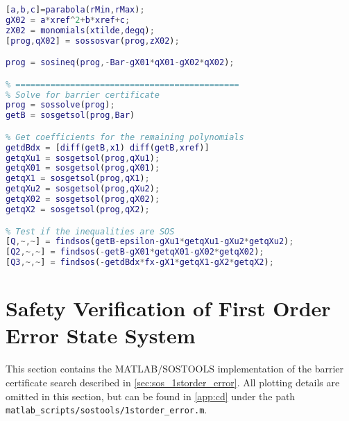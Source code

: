 \begin{lstlisting}[language=matlab]
[a,b,c]=parabola(rMin,rMax);
gX02 = a*xref^2+b*xref+c;
zX02 = monomials(xtilde,degq);
[prog,qX02] = sossosvar(prog,zX02);

prog = sosineq(prog,-Bar-gX01*qX01-gX02*qX02);

% =============================================
% Solve for barrier certificate
prog = sossolve(prog);
getB = sosgetsol(prog,Bar)

% Get coefficients for the remaining polynomials
getdBdx = [diff(getB,x1) diff(getB,xref)]
getqXu1 = sosgetsol(prog,qXu1);
getqX01 = sosgetsol(prog,qX01);
getqX1 = sosgetsol(prog,qX1);
getqXu2 = sosgetsol(prog,qXu2);
getqX02 = sosgetsol(prog,qX02);
getqX2 = sosgetsol(prog,qX2);

% Test if the inequalities are SOS
[Q,~,~] = findsos(getB-epsilon-gXu1*getqXu1-gXu2*getqXu2);
[Q2,~,~] = findsos(-getB-gX01*getqX01-gX02*getqX02);
[Q3,~,~] = findsos(-getdBdx*fx-gX1*getqX1-gX2*getqX2);
\end{lstlisting}

\section{Safety Verification of First Order Error State System}\label{app:sos_errorstate_firstorder}
This section contains the MATLAB/SOSTOOLS implementation of the barrier certificate search described in \autoref{sec:sos_1storder_error}. All plotting details are omitted in this section, but can be found in \autoref{app:cd} under the path \texttt{matlab\_scripts/sostools/1storder\_error.m}.

